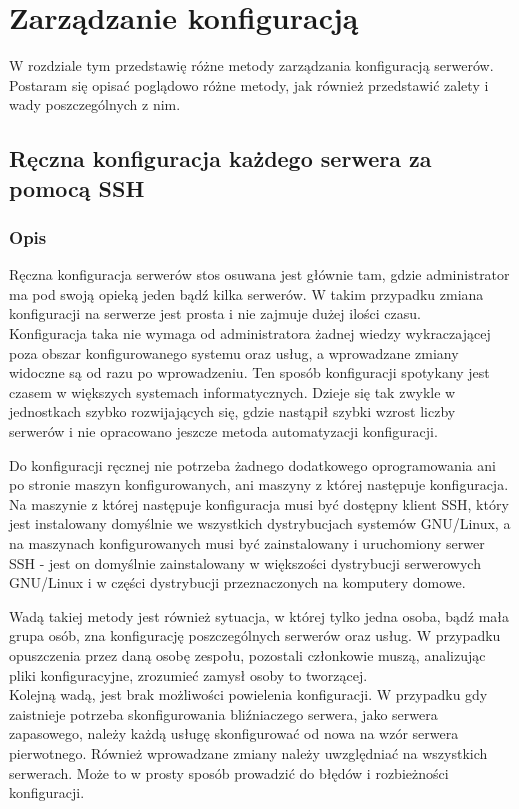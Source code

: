 \chapter{Zarządzanie konfiguracją}
\label{ch:zarzadzanie_konfiguracja}
W rozdziale tym przedstawię różne metody zarządzania konfiguracją serwerów. Postaram się opisać poglądowo różne metody, jak również przedstawić zalety i wady poszczególnych z nim.
\section{Ręczna konfiguracja każdego serwera za pomocą SSH}
\subsection{Opis}
Ręczna konfiguracja serwerów stos osuwana jest głównie tam, gdzie administrator ma pod swoją opieką jeden bądź kilka serwerów. W takim przypadku zmiana konfiguracji na serwerze jest prosta i nie zajmuje dużej ilości czasu.\\
Konfiguracja taka nie wymaga od administratora żadnej wiedzy wykraczającej poza obszar konfigurowanego systemu oraz usług, a wprowadzane zmiany widoczne są od razu po wprowadzeniu.
Ten sposób konfiguracji spotykany jest czasem w większych systemach informatycznych.
Dzieje się tak zwykle w jednostkach szybko rozwijających się, gdzie nastąpił szybki wzrost liczby serwerów i nie opracowano jeszcze metoda automatyzacji konfiguracji.

Do konfiguracji ręcznej nie potrzeba żadnego dodatkowego oprogramowania ani po stronie maszyn konfigurowanych, ani maszyny z której następuje konfiguracja.
Na maszynie z której następuje konfiguracja musi być dostępny klient SSH, który jest instalowany domyślnie we wszystkich dystrybucjach systemów GNU/Linux, a na maszynach konfigurowanych musi być zainstalowany i uruchomiony serwer SSH - jest on domyślnie zainstalowany w większości dystrybucji serwerowych GNU/Linux i w części dystrybucji przeznaczonych na komputery domowe.

Wadą takiej metody jest również sytuacja, w której tylko jedna osoba, bądź mała grupa osób, zna konfigurację poszczególnych serwerów oraz usług.
W przypadku opuszczenia przez daną osobę zespołu, pozostali członkowie muszą, analizując pliki konfiguracyjne, zrozumieć zamysł osoby to tworzącej.\\
Kolejną wadą, jest brak możliwości powielenia konfiguracji.
W przypadku gdy zaistnieje potrzeba skonfigurowania bliźniaczego serwera, jako serwera zapasowego, należy każdą usługę skonfigurować od nowa na wzór serwera pierwotnego. Również wprowadzane zmiany należy uwzględniać na wszystkich serwerach.
Może to w prosty sposób prowadzić do błędów i rozbieżności konfiguracji.
